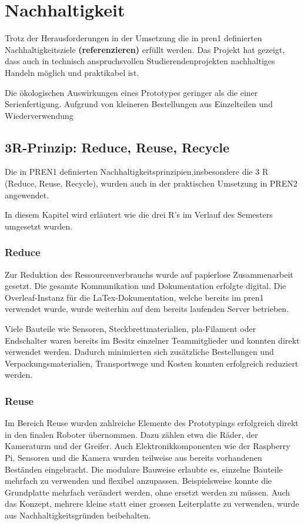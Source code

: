 \section{Nachhaltigkeit}

Trotz der Herausforderungen in der Umsetzung die in \acrshort{pren1}  definierten Nachhaltigkeitsziele \textbf{(referenzieren)} erfüllt werden. Das Projekt hat gezeigt, dass auch in technisch anspruchsvollen Studierendenprojekten nachhaltiges Handeln möglich und praktikabel ist.

Die ökologischen Auswirkungen eines Prototypes geringer als die einer Serienfertigung. Aufgrund von kleineren Bestellungen aus Einzelteilen und Wiederverwendung

\subsection{3R-Prinzip: Reduce, Reuse, Recycle}
Die in PREN1 definierten Nachhaltigkeitsprinzipien,insbesondere die 3 R (Reduce, Reuse, Recycle), wurden auch in der praktischen Umsetzung in PREN2 angewendet.  

 In diesem Kapitel wird erläutert wie die drei R's im Verlauf des Semesters umgesetzt wurden.

\subsubsection{Reduce}


Zur Reduktion des Ressourcenverbrauchs wurde auf papierlose Zusammenarbeit gesetzt. Die gesamte Kommunikation und Dokumentation erfolgte digital. Die Overleaf-Instanz für die LaTex-Dokumentation, welche bereits im \acrshort{pren1} verwendet wurde, wurde weiterhin auf dem bereits laufenden Server betrieben.

Viele Bauteile wie Sensoren, Steckbrettmaterialien, \acrshort{pla}-Filament oder Endschalter waren bereits im Besitz einzelner Teammitglieder und konnten direkt verwendet werden. Dadurch minimierten sich zusätzliche Bestellungen und Verpackungsmaterialien, Transportwege und Kosten konnten erfolgreich reduziert werden.

\subsubsection{Reuse}

Im Bereich Reuse wurden zahlreiche Elemente des Prototypings erfolgreich direkt in den finalen Roboter übernommen. Dazu zählen etwa die Räder, der Kameraturm und der Greifer. Auch Elektronikkomponenten wie der Raspberry Pi, Sensoren und die Kamera wurden teilweise aus bereits vorhandenen Beständen eingebracht. Die modulare Bauweise erlaubte es, einzelne Bauteile mehrfach zu verwenden und flexibel anzupassen. Beispielsweise konnte die Grundplatte mehrfach verändert werden, ohne ersetzt werden zu müssen. Auch das Konzept, mehrere kleine statt einer grossen Leiterplatte zu verwenden, wurde aus Nachhaltigkeitsgründen beibehalten.

